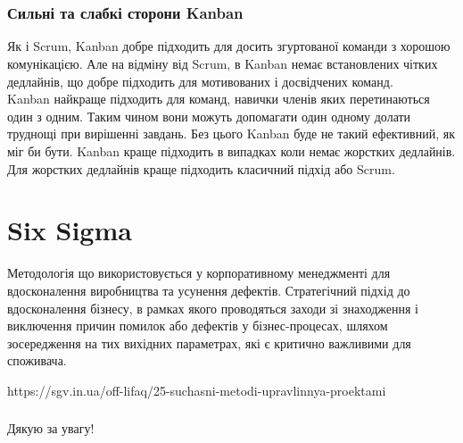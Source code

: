 \documentclass{beamer}
\begin{document}
\section{}
\begin{frame}
\frametitle{Сильні та слабкі сторони Kanban }


Як і Scrum, Kanban добре підходить для досить згуртованої команди з хорошою комунікацією. Але на відміну від Scrum, в Kanban немає встановлених чітких дедлайнів, що добре підходить для мотивованих і досвідчених команд.\\ 

 

Kanban найкраще підходить для команд, навички членів яких перетинаються один з одним. Таким чином вони можуть допомагати один одному долати труднощі при вирішенні завдань. Без цього Kanban буде не такий ефективний, як міг би бути. Kanban краще підходить в випадках коли немає жорстких дедлайнів. Для жорстких дедлайнів краще підходить класичний підхід або Scrum.
\end{frame}



\section{Six Sigma}
Методологія що використовується у корпоративному менеджменті для вдосконалення виробництва та усунення дефектів. Стратегічний підхід до вдосконалення бізнесу, в рамках якого проводяться заходи зі знаходження і виключення причин помилок або дефектів у бізнес-процесах, шляхом зосередження на тих вихідних параметрах, які є критично важливими для споживача.
 
 
 
https://sgv.in.ua/off-lifaq/25-suchasni-metodi-upravlinnya-proektami

 
 


 
\begin{frame}
\frametitle{}
\begin{center}
Дякую за увагу!
\end{center}
\end{frame}
\end{document}
